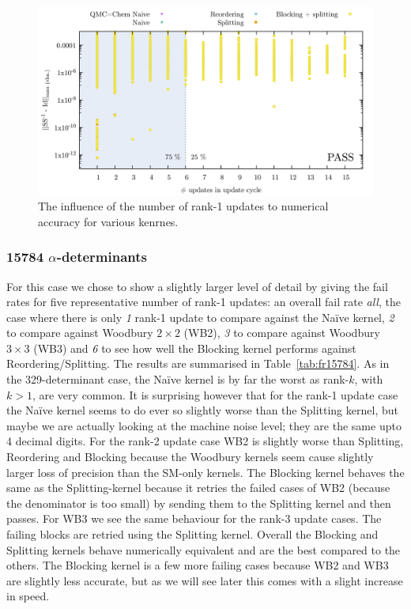 \documentclass[11pt]{article}
\numberwithin{figure}{section}
\numberwithin{table}{section}
\begin{document}
\begin{figure}
	\includegraphics[width=\linewidth]{num_acc_nupds.png}
	\caption{The influence of the number of rank-1 updates to numerical accuracy for various kenrnes.}
	\label{fig:num_acc_nupds}
\end{figure}

			\subsubsection{15784 $\alpha$-determinants}
				For this case we chose to show a slightly larger level of detail by giving the fail rates for five representative number of rank-1 updates: an overall fail rate \emph{all}, the case where there is only \emph{1} rank-1 update to compare against the Na\"{i}ve kernel, \emph{2} to compare against Woodbury $2\times2$ (WB2), \emph{3} to compare against Woodbury $3\times3$ (WB3) and \emph{6} to see how well the Blocking kernel performs against Reordering/Splitting. The results are summarised in Table~\ref{tab:fr15784}. As in the 329-determinant case, the Na\"{i}ve kernel is by far the worst as rank-$k$, with $k>1$, are very common. It is surprising however that for the rank-1 update case the Na\"{i}ve kernel seems to do ever so slightly worse than the Splitting kernel, but maybe we are actually looking at the machine noise level; they are the same upto 4 decimal digits. For the rank-2 update case WB2 is slightly worse than Splitting, Reordering and Blocking because the Woodbury kernels seem cause slightly larger loss of precision than the SM-only kernels. The Blocking kernel behaves the same as the Splitting-kernel because it retries the failed cases of WB2 (because the denominator is too small) by sending them to the Splitting kernel and then passes. For WB3 we see the same behaviour for the rank-3 update cases. The failing blocks are retried using the Splitting kernel. Overall the Blocking and Splitting kernels behave numerically equivalent and are the best compared to the others. The Blocking kernel is a few more failing cases because WB2 and WB3 are slightly less accurate, but as we will see later this comes with a slight increase in speed.
\end{document}
